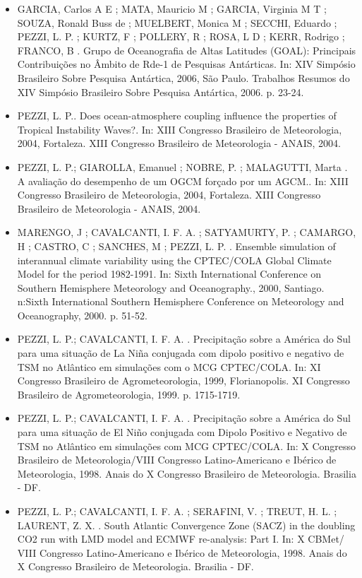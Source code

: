\documentclass[11pt, a4paper]{awesome-cv}
\begin{document}
\begin{cvletter}
\begin{itemize}
  \item[] GARCIA, Carlos A E ; MATA, Mauricio M ; GARCIA, Virginia M T ; SOUZA, Ronald Buss de ; MUELBERT, Monica M ; SECCHI, Eduardo ; PEZZI, L. P. ; KURTZ, F ; POLLERY, R ; ROSA, L D ; KERR, Rodrigo ; FRANCO, B . Grupo de Oceanografia de Altas Latitudes (GOAL): Principais Contribuições no Âmbito de Rde-1 de Pesquisas Antárticas. In: XIV Simpósio Brasileiro Sobre Pesquisa Antártica, 2006, São Paulo. Trabalhos Resumos do XIV Simpósio Brasileiro Sobre Pesquisa Antártica, 2006. p. 23-24. 
  \item[] PEZZI, L. P.. Does ocean-atmosphere coupling influence the properties of Tropical Instability Waves?. In: XIII Congresso Brasileiro de Meteorologia, 2004, Fortaleza. XIII Congresso Brasileiro de Meteorologia - ANAIS, 2004. 
  \item[] PEZZI, L. P.; GIAROLLA, Emanuel ; NOBRE, P. ; MALAGUTTI, Marta . A avaliação do desempenho de um OGCM forçado por um AGCM.. In: XIII Congresso Brasileiro de Meteorologia, 2004, Fortaleza. XIII Congresso Brasileiro de Meteorologia - ANAIS, 2004. 
  \item[] MARENGO, J ; CAVALCANTI, I. F. A. ; SATYAMURTY, P. ; CAMARGO, H ; CASTRO, C ; SANCHES, M ; PEZZI, L. P. . Ensemble simulation of interannual climate variability using the CPTEC/COLA Global Climate Model for the period 1982-1991. In: Sixth International Conference on Southern Hemisphere Meteorology and Oceanography., 2000, Santiago. n:Sixth International Southern Hemisphere Conference on Meteorology and Oceanography, 2000. p. 51-52. 
  \item[] PEZZI, L. P.; CAVALCANTI, I. F. A. . Precipitação sobre a América do Sul para uma situação de La Niña conjugada com dipolo positivo e negativo de TSM no Atlântico em simulações com o MCG CPTEC/COLA. In: XI Congresso Brasileiro de Agrometeorologia, 1999, Florianopolis. XI Congresso Brasileiro de Agrometeorologia, 1999. p. 1715-1719.  
  \item[] PEZZI, L. P.; CAVALCANTI, I. F. A. . Precipitação sobre a América do Sul para uma situação de El Niño conjugada com Dipolo Positivo e Negativo de TSM no Atlântico em simulações com MCG CPTEC/COLA. In: X Congresso Brasileiro de Meteorologia/VIII Congresso Latino-Americano e Ibérico de Meteorologia, 1998. Anais do X Congresso Brasileiro de Meteorologia. Brasilia - DF.  
  \item[] PEZZI, L. P.; CAVALCANTI, I. F. A. ; SERAFINI, V. ; TREUT, H. L. ; LAURENT, Z. X. . South Atlantic Convergence Zone (SACZ) in the doubling CO2 run with LMD model and ECMWF re-analysis: Part I. In: X CBMet/ VIII Congresso Latino-Americano e Ibérico de Meteorologia, 1998. Anais do X Congresso Brasileiro de Meteorologia. Brasilia - DF.

\end{itemize}
\end{cvletter}
\end{document}
